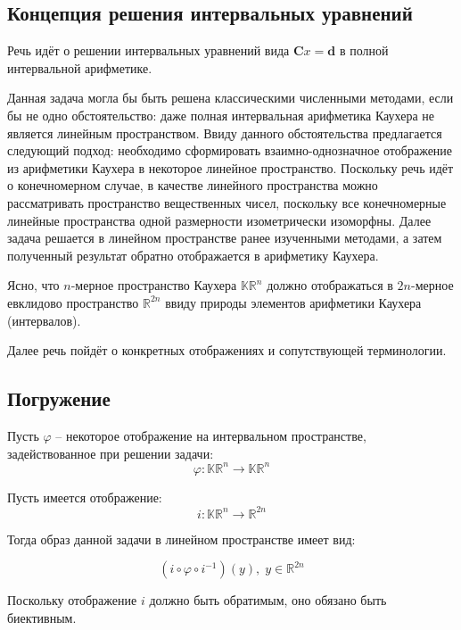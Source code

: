 \subsection{Концепция решения интервальных уравнений}

Речь идёт о решении интервальных уравнений вида $\mathbf{C}x = \mathbf{d}$ в полной интервальной арифметике.

Данная задача могла бы быть решена классическими численными методами, если бы не одно обстоятельство: даже полная интервальная арифметика Каухера не является линейным пространством. Ввиду данного обстоятельства предлагается следующий подход: необходимо сформировать взаимно-однозначное отображение из арифметики Каухера в некоторое линейное пространство. Поскольку речь идёт о конечномерном случае, в качестве линейного пространства можно рассматривать пространство вещественных чисел, поскольку все конечномерные линейные пространства одной размерности изометрически изоморфны.
Далее задача решается в линейном пространстве ранее изученными методами, а затем полученный результат обратно отображается в арифметику Каухера.

Ясно, что $n$-мерное пространство Каухера $\mathbb{KR}^n$ должно отображаться в $2n$-мерное евклидово пространство $\mathbb{R}^{2n}$ ввиду природы элементов арифметики Каухера (интервалов).

Далее речь пойдёт о конкретных отображениях и сопутствующей терминологии.

\subsection{Погружение}

Пусть $\varphi$ -- некоторое отображение на интервальном пространстве, задействованное при решении задачи:
\begin{equation}
\varphi: \mathbb{KR}^n \rightarrow \mathbb{KR}^n
\end{equation}

Пусть имеется отображение:
\begin{equation}
i: \mathbb{KR}^n \rightarrow \mathbb{R}^{2n}
\end{equation}

Тогда образ данной задачи в линейном пространстве имеет вид:

\begin{equation}
(i \circ \varphi \circ i^{-1})(y), \; y \in \mathbb{R}^{2n}
\end{equation}

Поскольку отображение $i$ должно быть обратимым, оно обязано быть биективным.

